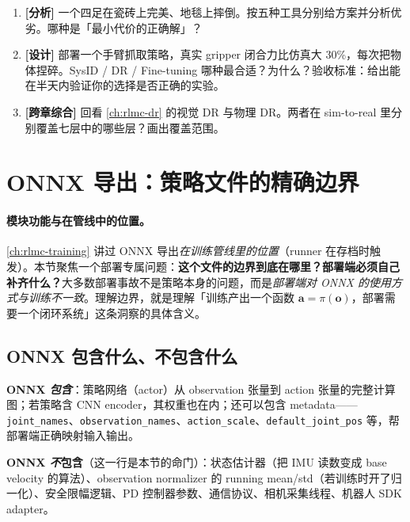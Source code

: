 \begin{practice}[工具选型]
\begin{enumerate}
  \item \textbf{[分析]} 一个四足在瓷砖上完美、地毯上摔倒。按五种工具分别给方案并分析优劣。哪种是「最小代价的正确解」？
  \item \textbf{[设计]} 部署一个手臂抓取策略，真实 gripper 闭合力比仿真大 30\%，每次把物体捏碎。SysID / DR / Fine-tuning 哪种最合适？为什么？验收标准：给出能在半天内验证你的选择是否正确的实验。
  \item \textbf{[跨章综合]} 回看 \cref{ch:rlmc-dr} 的视觉 DR 与物理 DR。两者在 sim-to-real 里分别覆盖七层中的哪些层？画出覆盖范围。
\end{enumerate}
\end{practice}

\section{ONNX 导出：策略文件的精确边界}
\label{sec:rlmc-s2r-onnx}

\paragraph{模块功能与在管线中的位置。}\cref{ch:rlmc-training} 讲过 ONNX 导出\emph{在训练管线里的位置}（runner 在存档时触发）。本节聚焦一个部署专属问题：\textbf{这个文件的边界到底在哪里？部署端必须自己补齐什么？}大多数部署事故不是策略本身的问题，而是\emph{部署端对 ONNX 的使用方式与训练不一致}。理解边界，就是理解「训练产出一个函数 $\mathbf a=\pi(\mathbf o)$，部署需要一个闭环系统」这条洞察的具体含义。

\subsection{ONNX 包含什么、不包含什么}
\label{sec:rlmc-s2r-onnx-boundary}

\textbf{ONNX \emph{包含}}：策略网络（actor）从 observation 张量到 action 张量的完整计算图；若策略含 CNN encoder，其权重也在内；还可以包含 metadata——\verb|joint_names|、\verb|observation_names|、\verb|action_scale|、\verb|default_joint_pos| 等，帮部署端正确映射输入输出。

\textbf{ONNX \emph{不}包含}（这一行是本节的命门）：状态估计器（把 IMU 读数变成 base velocity 的算法）、observation normalizer 的 running mean/std（若训练时开了归一化）、安全限幅逻辑、PD 控制器参数、通信协议、相机采集线程、机器人 SDK adapter。

